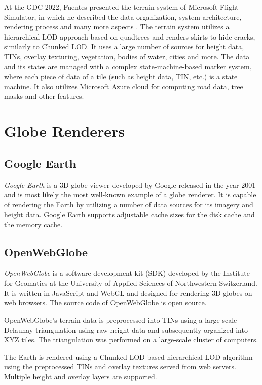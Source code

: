 At the GDC 2022, Fuentes presented the terrain system of Microsoft Flight Simulator,
in which he described the data organization, system architecture, rendering process and many more aspects \cite{msflight}.
The terrain system utilizes a hierarchical LOD approach based on quadtrees and renders 
skirts to hide cracks, similarly to Chunked LOD.
It uses a large number of sources for height data, TINs, overlay texturing, vegetation, bodies of water, cities
and more. The data and its states are managed with a complex state-machine-based marker system,
where each piece of data of a tile (such as height data, TIN, etc.) is a state machine.
It also utilizes Microsoft Azure cloud for computing road data, tree masks and other features.

\section{Globe Renderers}
\subsection{Google Earth}
\textit{Google Earth} is a 3D globe viewer developed by Google 
released in the year 2001 and is most likely the 
most well-known example of a globe renderer.
It is capable of rendering the Earth by utilizing a number of data sources 
for its imagery and height data. 
Google Earth supports adjustable cache sizes for the disk cache and the memory cache.

\subsection{OpenWebGlobe}
\textit{OpenWebGlobe} \cite{openwebglobe} is a software development kit (SDK)
developed by the Institute for Geomatics at the 
University of Applied Sciences of Northwestern Switzerland. 
It is written in JavaScript and 
WebGL and designed for rendering 3D globes on web browsers. 
The source code of OpenWebGlobe is open source.

OpenWebGlobe's terrain data is preprocessed into TINs using 
a large-scale Delaunay triangulation using raw height data and subsequently organized into 
XYZ tiles. The triangulation was performed on a 
large-scale cluster of computers.

The Earth is rendered using a Chunked LOD-based 
hierarchical LOD algorithm using the preprocessed TINs 
and overlay textures served from web servers.
Multiple height and overlay layers are supported.

